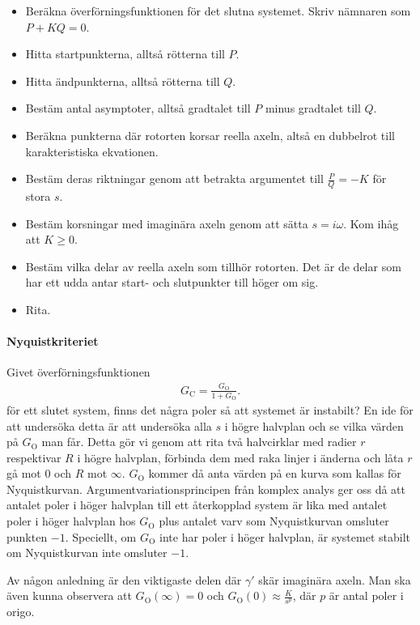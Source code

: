 \begin{itemize}
	\item Beräkna överförningsfunktionen för det slutna systemet. Skriv nämnaren som $P + KQ = 0$.
	\item Hitta startpunkterna, alltså rötterna till $P$.
	\item Hitta ändpunkterna, alltså rötterna till $Q$.
	\item Bestäm antal asymptoter, alltså gradtalet till $P$ minus gradtalet till $Q$.
	\item Beräkna punkterna där rotorten korsar reella axeln, altså en dubbelrot till karakteristiska ekvationen.
	\item Bestäm deras riktningar genom att betrakta argumentet till $\frac{P}{Q} = -K$ för stora $s$.
	\item Bestäm korsningar med imaginära axeln genom att sätta $s = i\omega$. Kom ihåg att $K\geq 0$.
	\item Bestäm vilka delar av reella axeln som tillhör rotorten. Det är de delar som har ett udda antar start- och slutpunkter till höger om sig.
	\item Rita.
\end{itemize}

\paragraph{Nyquistkriteriet}
Givet överförningsfunktionen
\begin{align*}
	G_{\text{C}} = \frac{G_{\text{O}}}{1 + G_{\text{O}}}.
\end{align*}
för ett slutet system, finns det några poler så att systemet är instabilt? En ide för att undersöka detta är att undersöka alla $s$ i högre halvplan och se vilka värden på $G_{\text{O}}$ man får. Detta gör vi genom att rita två halvcirklar med radier $r$ respektivar $R$ i högre halvplan, förbinda dem med raka linjer i änderna och låta $r$ gå mot $0$ och $R$ mot $\infty$. $G_{\text{O}}$ kommer då anta värden på en kurva som kallas för Nyquistkurvan. Argumentvariationsprincipen från komplex analys ger oss då att antalet poler i höger halvplan till ett återkopplad system är lika med antalet poler i höger halvplan hos $G_{\text{O}}$ plus antalet varv som Nyquistkurvan omsluter punkten $-1$. Speciellt, om $G_{\text{O}}$ inte har poler i höger halvplan, är systemet stabilt om Nyquistkurvan inte omsluter $-1$.

Av någon anledning är den viktigaste delen där $\gamma'$ skär imaginära axeln. Man ska även kunna observera att $G_{\text{O}}(\infty) = 0$ och $G_{\text{O}}(0)\approx\frac{K}{s^{p}}$, där $p$ är antal poler i origo.

